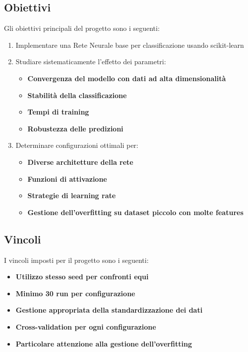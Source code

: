 \documentclass[11pt,a4paper]{article}
\begin{document}
\subsection{Obiettivi}
Gli obiettivi principali del progetto sono i seguenti:
\begin{enumerate}
    \item Implementare una Rete Neurale base per classificazione usando scikit-learn
    \item  Studiare sistematicamente l'effetto dei parametri:
    \begin{itemize}
        \item \textbf{Convergenza del modello con dati ad alta dimensionalità}
        \item \textbf{Stabilità della classificazione}
        \item \textbf{Tempi di training}
        \item \textbf{Robustezza delle predizioni}
    \end{itemize}
    \item Determinare configurazioni ottimali per:
    \begin{itemize}
        \item \textbf{Diverse architetture della rete}
        \item \textbf{Funzioni di attivazione}
        \item \textbf{Strategie di learning rate}
        \item \textbf{Gestione dell'overfitting su dataset piccolo con molte features}
    \end{itemize}
\end{enumerate}

\subsection{Vincoli}
I vincoli imposti per il progetto sono i seguenti:
\begin{itemize}
    \item \textbf{Utilizzo stesso seed per confronti equi}
    \item \textbf{Minimo 30 run per configurazione}
    \item \textbf{Gestione appropriata della standardizzazione dei dati}
    \item \textbf{Cross-validation per ogni configurazione}
    \item \textbf{Particolare attenzione alla gestione dell'overfitting}
\end{itemize}
\end{document}
